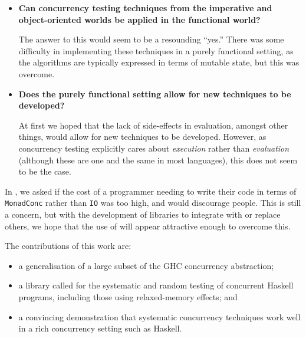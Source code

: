 \begin{itemize}
\item \textbf{Can concurrency testing techniques from the imperative
    and object-oriented worlds be applied in the functional world?}
  \hfill

  The answer to this would seem to be a resounding ``yes.''  There was
  some difficulty in implementing these techniques in a purely
  functional setting, as the algorithms are typically expressed in
  terms of mutable state, but this was overcome.

\item \textbf{Does the purely functional setting allow for new
    techniques to be developed?} \hfill

  At first we hoped that the lack of side-effects in evaluation,
  amongst other things, would allow for new techniques to be
  developed.  However, as concurrency testing explicitly cares about
  \emph{execution} rather than \emph{evaluation} (although these are
  one and the same in most languages), this does not seem to be the
  case.
\end{itemize}

In \cite{walker2015}, we asked if the cost of a programmer needing to
write their code in terms of \verb|MonadConc| rather than \verb|IO|
was too high, and would discourage people.  This is still a concern,
but with the development of libraries to integrate with or replace
others, we hope that the use of \dejafu{} will appear attractive
enough to overcome this.

The contributions of this work are:

\begin{itemize}
\item a generalisation of a large subset of the GHC concurrency
  abstraction;

\item a library called \dejafu{} for the systematic and random testing
  of concurrent Haskell programs, including those using relaxed-memory
  effects; and

\item a convincing demonstration that systematic concurrency
  techniques work well in a rich concurrency setting such as Haskell.
\end{itemize}

